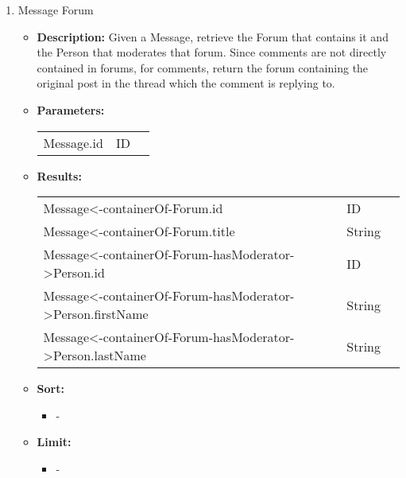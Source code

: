 {\begin{enumerate}
  \item Message Forum
    \begin{itemize}
      \item \textbf{Description:}
        Given a Message, retrieve the Forum that contains it
        and the Person that moderates that forum. Since comments are not
        directly contained in forums, for comments, return the forum containing
        the original post in the thread which the comment is replying to.
      \item \textbf{Parameters:} \\
        \begin{tabular}{lll}
          Message.id 										& ID \\
        \end{tabular}
      \item \textbf{Results:} \\
        \begin{tabular}{lll}
          Message<-containerOf-Forum.id                       & ID \\
          Message<-containerOf-Forum.title     									& String \\
          Message<-containerOf-Forum-hasModerator->Person.id     									& ID \\
          Message<-containerOf-Forum-hasModerator->Person.firstName    									& String \\
          Message<-containerOf-Forum-hasModerator->Person.lastName    									& String \\
        \end{tabular}
            \item \textbf{Sort:}
                  \begin{itemize}
                    \item[] -
                  \end{itemize}
            \item \textbf{Limit:}
                  \begin{itemize}
                    \item[] -
                  \end{itemize}
    \end{itemize}


\end{enumerate}}
